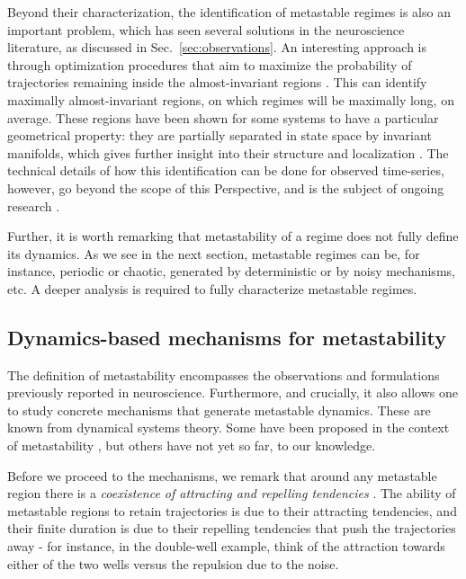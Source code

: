 Beyond their characterization, the identification of metastable regimes is also an important problem, which has seen several solutions in the neuroscience literature, as discussed in Sec.~\ref{sec:observations}. An interesting approach is through optimization procedures that aim to maximize the probability of trajectories remaining inside the almost-invariant regions \cite{froyland2003detecting, froyland2005statistically, dellnitz2003congestion}. This can identify maximally almost-invariant regions, on which regimes will be maximally long, on average. These regions have been shown for some systems to have a particular geometrical property: they are partially separated in state space by invariant manifolds, which gives further insight into their structure and localization \cite{froyland2009almost}. 
The technical details of how this identification can be done for observed time-series, however, go beyond the scope of this Perspective, and is the subject of ongoing research \cite{froyland2018robust}. 

Further, it is worth remarking that metastability of a regime does not fully define its dynamics. As we see in the next section, metastable regimes can be, for instance, periodic or chaotic, generated by deterministic or by noisy mechanisms, etc. A deeper analysis is required to fully characterize metastable regimes. 



\subsection{Dynamics-based mechanisms for metastability} \label{sec:mechanisms}

The definition of metastability encompasses the observations and formulations previously reported in neuroscience. Furthermore, and crucially, it also allows one to study concrete mechanisms that generate metastable dynamics. These are known from dynamical systems theory. Some have been proposed in the context of metastability \cite{graben2019metastable, cavanna2018dynamic, brinkman2022metastable}, but others have not yet so far, to our knowledge.

Before we proceed to the mechanisms, we remark that around any metastable region there is a \textit{coexistence of attracting and repelling tendencies} \cite{tognoli2014metastable, kaneko2003chaotic}. The ability of metastable regions to retain trajectories is due to their attracting tendencies, and their finite duration is due to their repelling tendencies that push the trajectories away - for instance, in the double-well example, think of the attraction towards either of the two wells versus the repulsion due to the noise.

